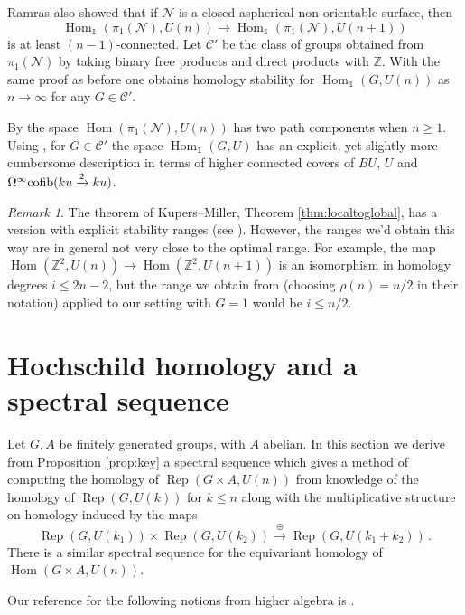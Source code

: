 \documentclass[oneside, a4paper, 12pt]{article}
\numberwithin{equation}{section}
\DeclareMathOperator{\Rep}{Rep}
\DeclareMathOperator{\Hom}{Hom}
\newcommand{\Z}{\mathbb{Z}}
\theoremstyle{plain}
\theoremstyle{definition}
\theoremstyle{remark}
\newtheorem{remark}[theorem]{Remark}
\begin{document}
Ramras \cite{RThesis} also showed that if $\mathcal{N}$ is a closed aspherical non-orientable surface, then
\[
\Hom_{\mathds{1}}(\pi_1(\mathcal{N}),U(n)) \to \Hom_{\mathds{1}}(\pi_1(\mathcal{N}),U(n+1))
\]
is at least $(n-1)$-connected. Let $\mathcal{C}'$ be the class of groups obtained from $\pi_1(\mathcal{N})$ by taking binary free products and direct products with $\Z$. With the same proof as before one obtains homology stability for $\Hom_{\mathds{1}}(G,U(n))$ as $n\to \infty$ for any $G\in \mathcal{C}'$.

By \cite[Corollary 4.12]{RYangMills} the space $\Hom(\pi_1(\mathcal{N}),U(n))$ has two path components when $n\geq 1$. Using \cite[Theorem 6.1]{RModuli}, for $G\in \mathcal{C}'$ the space $\Hom_{\mathds{1}}(G,U)$ has an explicit, yet slightly more cumbersome description in terms of higher connected covers of $BU$, $U$ and $\Omega^\infty \textnormal{cofib}(ku\xrightarrow{2} ku)$.



\begin{remark}
The theorem of Kupers--Miller, Theorem \ref{thm:localtoglobal}, has a version with explicit stability ranges (see \cite[Theorem 74]{KM18}). However, the ranges we'd obtain this way are in general not very close to the optimal range. For example, the map $\Hom(\Z^2,U(n))\to \Hom(\Z^2,U(n+1))$ is an isomorphism in homology degrees $i\leq 2n-2$, but the range we obtain from \cite[Theorem 74]{KM18} (choosing $\rho(n)=n/2$ in their notation) applied to our setting with $G=1$ would be $i\leq n/2$.
\end{remark}


\section{Hochschild homology and a spectral sequence} \label{sec:ss}

Let $G,A$ be finitely generated groups, with $A$ abelian. In this section we derive from Proposition \ref{prop:key} a spectral sequence which gives a method of computing the homology of $\Rep(G\times A,U(n))$ from knowledge of the homology of $\Rep(G,U(k))$ for $k\leq n$ along with the multiplicative structure on homology induced by the maps
\[
\Rep(G,U(k_1))\times \Rep(G,U(k_2))\xrightarrow{\oplus} \Rep(G,U(k_1+k_2))\,.
\]
There is a similar spectral sequence for the equivariant homology of $\Hom(G\times A,U(n))$.

Our reference for the following notions from higher algebra is \cite{HA}.
\end{document}
